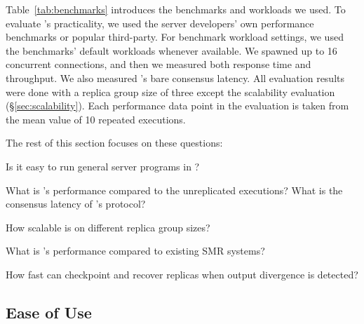 Table~\ref{tab:benchmarks} introduces the benchmarks and workloads we used. To 
evaluate \xxx's practicality, we used the server developers' own performance 
benchmarks or popular third-party. For benchmark workload settings, we used the 
benchmarks' default workloads whenever available. We spawned up to 16 
concurrent connections, and then we measured both response time and 
throughput. We also measured \xxx's bare consensus latency. All evaluation 
results were done with a replica group size of three except the scalability 
evaluation (\S\ref{sec:scalability}). Each performance data point in the 
evaluation is taken from the mean value of 10 repeated executions.

The rest of this section focuses on these questions:

\begin{tightenum}

\item[\S\ref{sec:ease-of-use}:] Is it easy to run general server programs 
in \xxx?

\item[\S\ref{sec:overhead}:] What is \xxx's performance compared to the 
unreplicated executions? What is the consensus latency of \xxx's \paxos 
protocol?

\item[\S\ref{sec:scalability}:] How scalable is \xxx on different replica group 
sizes?

\item[\S\ref{sec:compare}:] What is \xxx's performance compared to existing 
SMR systems?

\item[\S\ref{sec:robust}:] How fast can \xxx checkpoint and recover replicas 
when output divergence is detected?



\end{tightenum}


\subsection{Ease of Use} \label{sec:ease-of-use}

